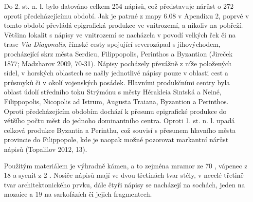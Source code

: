 \NC\AR
\HL
\HL
\stoptable

Do 2. st. n. l. bylo datováno celkem 254 nápisů, což představuje nárůst o 272  oproti předcházejícímu období. Jak je patrné z mapy 6.08 v Apendixu 2, poprvé v tomto období převládá epigrafická produkce ve vnitrozemí, a nikoliv na pobřeží. Většina lokalit s nápisy ve vnitrozemí se nacházela v povodí velkých řek či na trase {\em Via Diagonalis}, římské cesty spojující severozápad s jihovýchodem, procházející skrz města Serdicu, Filippopolis, Perinthos a Byzantion (Jireček 1877; Madzharov 2009, 70-31). Nápisy pocházely převážně z níže položených sídel, v horských oblastech se našly jednotlivé nápisy pouze v oblasti cest a průsmyků či v okolí vojenských posádek. Hlavními produkčními centry byla oblast údolí středního toku Strýmónu s městy Hérakleia Sintská a Neiné, Filippopolis, Nicopolis ad Istrum, Augusta Traiana, Byzantion a Perinthos. Oproti předcházejícím obdobím dochází k přesunu epigrafické produkce do většího počtu měst do jednoho dominantního centra. Oproti 1. st. n. l. upadá celková produkce Byzantia a Perinthu, což souvisí s přesunem hlavního města provincie do Filippopole, kde je naopak možné pozorovat markantní nárůst nápisů (Topalilov 2012, 13).

Použitým materiálem je výhradně kámen, a to zejména mramor ze 70 , vápenec z 18  a syenit z 2 . Nosiče nápisů mají ve dvou třetinách tvar stély, v necelé třetině tvar architektonického prvku, dále čtyři nápisy se nacházejí na sochách, jeden na mozaice a 19 na sarkofázích či jejich fragmentech.

